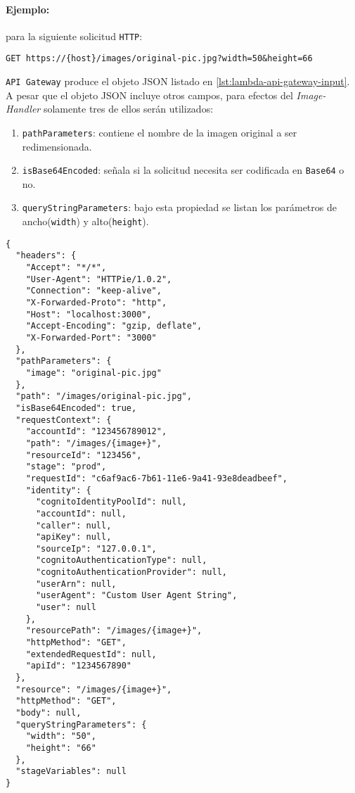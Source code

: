 \paragraph{Ejemplo:} para la siguiente solicitud \texttt{HTTP}:
\begin{verbatim}
GET https://{host}/images/original-pic.jpg?width=50&height=66
\end{verbatim}

\noindent \texttt{API Gateway} produce el objeto JSON listado en \ref{lst:lambda-api-gateway-input}. A pesar que el objeto JSON incluye otros campos, para efectos del \emph{Image-Handler} solamente tres de ellos serán utilizados:
\begin{enumerate}
    \item \texttt{pathParameters}: contiene el nombre de la imagen original a ser redimensionada.
    \item \texttt{isBase64Encoded}: señala si la solicitud necesita ser codificada en \texttt{Base64} o no. 
    \item \texttt{queryStringParameters}: bajo esta propiedad se listan los parámetros de ancho(\texttt{width}) y alto(\texttt{height}).
\end{enumerate}


\begin{lstlisting}[caption={Clase \texttt{ImageHandler.java}}, label={lst:lambda-api-gateway-input}]
{
  "headers": {
    "Accept": "*/*",
    "User-Agent": "HTTPie/1.0.2",
    "Connection": "keep-alive",
    "X-Forwarded-Proto": "http",
    "Host": "localhost:3000",
    "Accept-Encoding": "gzip, deflate",
    "X-Forwarded-Port": "3000"
  },
  "pathParameters": {
    "image": "original-pic.jpg"
  },
  "path": "/images/original-pic.jpg",
  "isBase64Encoded": true,
  "requestContext": {
    "accountId": "123456789012",
    "path": "/images/{image+}",
    "resourceId": "123456",
    "stage": "prod",
    "requestId": "c6af9ac6-7b61-11e6-9a41-93e8deadbeef",
    "identity": {
      "cognitoIdentityPoolId": null,
      "accountId": null,
      "caller": null,
      "apiKey": null,
      "sourceIp": "127.0.0.1",
      "cognitoAuthenticationType": null,
      "cognitoAuthenticationProvider": null,
      "userArn": null,
      "userAgent": "Custom User Agent String",
      "user": null
    },
    "resourcePath": "/images/{image+}",
    "httpMethod": "GET",
    "extendedRequestId": null,
    "apiId": "1234567890"
  },
  "resource": "/images/{image+}",
  "httpMethod": "GET",
  "body": null,
  "queryStringParameters": {
    "width": "50",
    "height": "66"
  },
  "stageVariables": null
}
\end{lstlisting}

